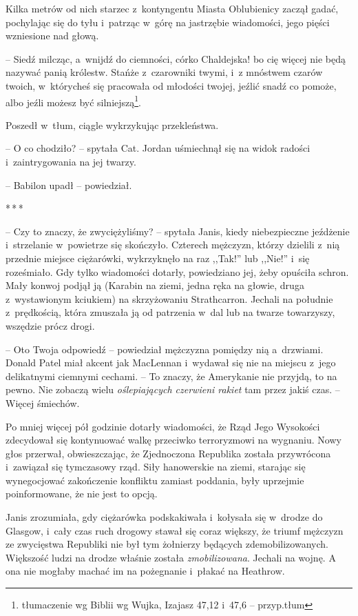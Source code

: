 \documentclass[oneside,polish,11pt,sfheadings]{mwbk}
\newcommand{\threeast}{\bigskip\par\centerline{*\,*\,*}\medskip\par}%
\begin{document}
Kilka metrów od nich starzec z~kontyngentu Miasta Oblubienicy zaczął
gadać, pochylając się do tyłu i~patrząc w~górę na jastrzębie wiadomości,
jego pięści wzniesione nad głową. 

-- Siedź milcząc, a~wnijdź do
ciemności, córko Chaldejska! bo cię więcej nie będą nazywać panią
królestw. Stańże z~czarowniki twymi, i~z mnóstwem czarów twoich, w~którycheś się pracowała od młodości twojej, jeźlić snadź co pomoże, albo
jeźli możesz być silniejszą\footnote{ tłumaczenie wg Biblii wg Wujka, Izajasz 47,12 i~47,6 -- przyp.tłum}.

Poszedł w~tłum, ciągle wykrzykując przekleństwa.

-- O co chodziło? -- spytała Cat. Jordan uśmiechnął się na widok radości i~zaintrygowania na jej twarzy.

-- Babilon upadł -- powiedział.
  \threeast 

-- Czy to znaczy, że zwyciężyliśmy? -- spytała Janis, kiedy niebezpieczne
jeźdżenie i~strzelanie w~powietrze się skończyło. Czterech mężczyzn,
którzy dzielili z~nią przednie miejsce ciężarówki, wykrzyknęło na raz
,,Tak!'' lub ,,Nie!'' i~się roześmiało. Gdy tylko wiadomości dotarły,
powiedziano jej, żeby opuściła schron. Mały konwoj podjął ją (Karabin na
ziemi, jedna ręka na głowie, druga z~wystawionym kciukiem) na
skrzyżowaniu Strathcarron. Jechali na południe z~prędkością, która
zmuszała ją od patrzenia w~dal lub na twarze towarzyszy, wszędzie prócz
drogi.

-- Oto Twoja odpowiedź -- powiedział mężczyzna pomiędzy nią a~drzwiami.
Donald Patel miał akcent jak MacLennan i~wydawał się nie na miejscu z~jego delikatnymi ciemnymi cechami. -- To znaczy, że Amerykanie nie
przyjdą, to na pewno. Nie zobaczą wielu \emph{oślepiających czerwieni
rakiet} tam przez jakiś czas. -- Więcej śmiechów.

Po mniej więcej pół godzinie dotarły wiadomości, że Rząd Jego Wysokości
zdecydował się kontynuować walkę przeciwko terroryzmowi na wygnaniu. Nowy
głos przerwał, obwieszczając, że Zjednoczona Republika została
przywrócona i~zawiązał się tymczasowy rząd. Siły hanowerskie na ziemi,
starając się wynegocjować zakończenie konfliktu zamiast poddania, były
uprzejmie poinformowane, że nie jest to opcją.

Janis zrozumiała, gdy ciężarówka podskakiwała i~kołysała się w~drodze do
Glasgow, i~cały czas ruch drogowy stawał się coraz większy, że triumf
mężczyzn ze zwycięstwa Republiki nie był tym żołnierzy będących
zdemobilizowanych. Większość ludzi na drodze właśnie została
\emph{zmobilizowana}. Jechali na wojnę. A ona nie mogłaby machać im na
pożegnanie i~płakać na Heathrow.
\end{document}
